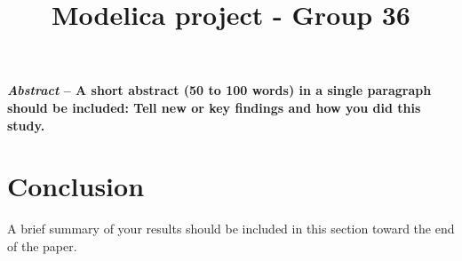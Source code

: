 \documentclass[
	10pt,				    %
	a4paper,         		%
	twocolumn,
	]{article}
\title{\Large \bf
Modelica project - Group 36}
\date{}
\author{\authorthing}
\begin{document}
\renewcommand\figurename{Fig.}

\setlength{\droptitle}{1.0cm}
\maketitle
\thispagestyle{empty}
\pagestyle{empty}



\textbf{\textit{Abstract} -- A short abstract (50 to 100 words) in a single paragraph should be included: Tell new or key findings and how you did this study.}


%

%

%

%

%

%
%
%
\section*{Conclusion}
A brief summary of your results should be included in this section toward the end of the paper.
%
%
\onecolumn
\newpage
\appendix
\begin{appendices}

\twocolumn

\end{appendices}

\printbibliography
\end{document}

